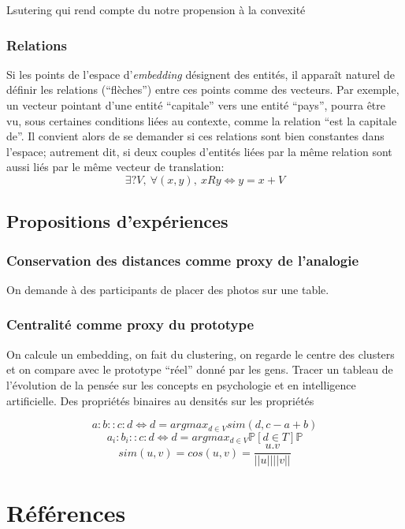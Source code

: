 \documentclass[french]{article}
\begin{document}
				Lsutering qui rend compte du notre propension à la convexité
			\subsubsection{Relations}
				Si les points de l'espace d'\textit{embedding} désignent des entités, il apparaît naturel de définir les relations (``flèches'') entre ces points comme des vecteurs. Par exemple, un vecteur pointant d'une entité ``capitale'' vers une entité ``pays'', pourra être vu, sous certaines conditions liées au contexte, comme la relation ``est la capitale de''. Il convient alors de se demander si ces relations sont bien constantes dans l'espace; autrement dit, si deux couples d'entités liées par la même relation sont aussi liés par le même vecteur de translation:
				\begin{equation}
				\exists?V, \ \forall (x, y), \ xRy \iff  y = x+V
				\end{equation}
		\subsection{Propositions d'expériences}
			\subsubsection{Conservation des distances comme proxy de l'analogie}
				On demande à des participants de placer des photos sur une table.
			\subsubsection{Centralité comme proxy du prototype}
				On calcule un embedding, on fait du clustering, on regarde le centre des clusters et on compare avec le prototype ``réel'' donné par les gens.
				Tracer un tableau de l'évolution de la pensée sur les concepts en psychologie et en intelligence artificielle. Des propriétés binaires au densités sur les propriétés

		\begin{equation}
		a:b::c:d \iff d = argmax_{d\in V}sim(d, c-a+b)
		\end{equation}
		\begin{equation}
		a_i:b_i::c:d \iff d = argmax_{d \in V}\mathds{P}[d \in T]\mathds{P}
		\end{equation}
		\begin{equation}
		sim(u, v) = cos(u, v) = \frac{u.v}{||u|| ||v||}
		\end{equation}
		
	\section*{Références}
	\printbibliography[heading=main, keyword=main]
	\printbibliography[heading=minor, keyword=minor]
\end{document}
